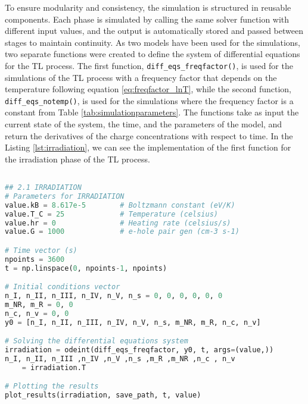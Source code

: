 To ensure modularity and consistency, the simulation is structured in reusable components. Each phase is simulated by calling the same solver function with different input values, and the output is automatically stored and passed between stages to maintain continuity. As two models have been used for the simulations, two separate functions were created to define the system of differential equations for the TL process. The first function, \texttt{diff\_eqs\_freqfactor()}, is used for the simulations of the TL process with a frequency factor that depends on the temperature following equation \ref{eq:freqfactor_lnT}, while the second function, \texttt{diff\_eqs\_notemp()}, is used for the simulations where the frequency factor is a constant from Table \ref{tab:simulationparameters}. The functions take as input the current state of the system, the time, and the parameters of the model, and return the derivatives of the charge concentrations with respect to time. In the Listing \ref{lst:irradiation}, we can see the implementation of the first function for the irradiation phase of the TL process.

\vspace{10pt}

\renewcommand{\baselinestretch}{1}
\begin{lstlisting}[language=Python, caption={Python simulation of the irradiation phase in TL simulations. It defines the initial parameters, initializes trap and recombination center populations, solves the system of differential equations, and plots the results.}, label=lst:irradiation]

## 2.1 IRRADIATION
# Parameters for IRRADIATION
value.kB = 8.617e-5        # Boltzmann constant (eV/K)
value.T_C = 25             # Temperature (celsius)
value.hr = 0               # Heating rate (celsius/s)
value.G = 1000             # e-hole pair gen (cm-3 s-1)

# Time vector (s)
npoints = 3600
t = np.linspace(0, npoints-1, npoints)

# Initial conditions vector
n_I, n_II, n_III, n_IV, n_V, n_s = 0, 0, 0, 0, 0, 0
m_NR, m_R = 0, 0
n_c, n_v = 0, 0
y0 = [n_I, n_II, n_III, n_IV, n_V, n_s, m_NR, m_R, n_c, n_v]

# Solving the differential equations system
irradiation = odeint(diff_eqs_freqfactor, y0, t, args=(value,))
n_I, n_II, n_III ,n_IV ,n_V ,n_s ,m_R ,m_NR ,n_c , n_v 
    = irradiation.T

# Plotting the results
plot_results(irradiation, save_path, t, value)


\end{lstlisting}
\renewcommand{\baselinestretch}{1.5}

